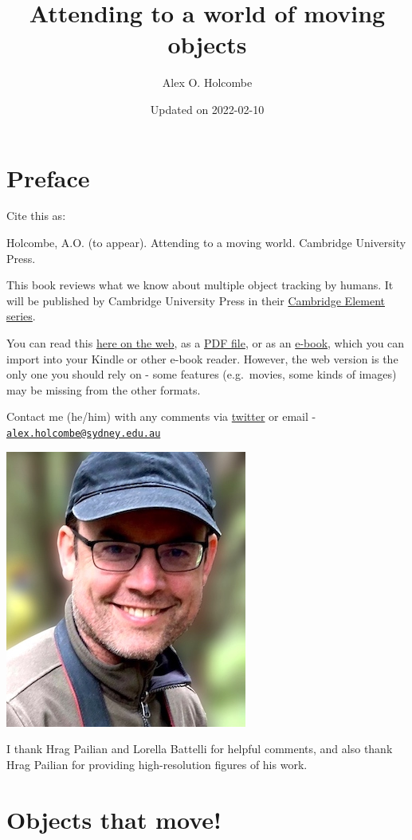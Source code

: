 \documentclass[
]{book}
\title{Attending to a world of moving objects}
\author{Alex O. Holcombe}
\date{Updated on 2022-02-10}
\begin{document}
\maketitle

{
\setcounter{tocdepth}{1}
\tableofcontents
}
\listoffigures
\hypertarget{preface}{%
\chapter*{Preface}\label{preface}}

Cite this as:

Holcombe, A.O. (to appear). Attending to a moving world. Cambridge University Press.

This book reviews what we know about multiple object tracking by humans. It will be published by Cambridge University Press in their \href{https://www.cambridge.org/core/what-we-publish/elements/elements-in-perception}{Cambridge Element series}.

You can read this \href{https://tracking.whatanimalssee.com/index.html}{here on the web}, as a \href{bookdown-demo.pdf}{PDF file}, or as an \href{bookdown-demo.epub}{e-book}, which you can import into your Kindle or other e-book reader. However, the web version is the only one you should rely on - some features (e.g.~movies, some kinds of images) may be missing from the other formats.

Contact me (he/him) with any comments via \href{https://twitter.com/ceptional}{twitter} or email - \href{mailto:alex.holcombe@sydney.edu.au}{\nolinkurl{alex.holcombe@sydney.edu.au}}

\includegraphics[width=0.25\linewidth]{imagesForRmd/corellaOnShoulder2020croppedBlurredByAdobeOnline}

I thank Hrag Pailian and Lorella Battelli for helpful comments, and also thank Hrag Pailian for providing high-resolution figures of his work.

\hypertarget{objects-that-move}{%
\chapter{Objects that move!}\label{objects-that-move}}
\end{document}
